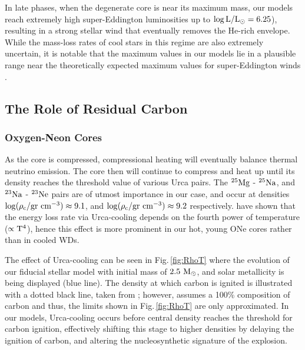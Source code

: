 \documentclass[../../main/thesis_msc.tex]{subfiles}
\begin{document}
In late phases, when the degenerate core is near its maximum mass, our models reach extremely high super-Eddington luminosities up to $\rm \log{L/L_\odot = 6.25}$), resulting in a strong stellar wind that eventually removes the He-rich envelope. While the mass-loss rates of cool stars in this regime are also extremely uncertain, it is notable that the maximum values in our models lie in a plausible range near the theoretically expected maximum values for super-Eddington winds \citep[][]{Owocki:2004zz,Smith2006}.
        
 



    \subsection{The Role of Residual Carbon} \label{sec:residualCarbon}
    
        \subsubsection{Oxygen-Neon Cores}
        
        As the core is compressed, compressional heating will eventually balance thermal neutrino emission. The core then will continue to compress and heat up until its density reaches the threshold value of various Urca pairs. The $\rm ^{25}Mg$ - $\rm ^{25}Na$, and $\rm ^{23}Na$ - $\rm ^{23}Ne$ pairs are of utmost importance in our case, and occur at densities $\rm \log(\rho_c / \rm gr \ cm^{-3}) \approx 9.1$, and $\rm \log(\rho_c / \rm gr \ cm^{-3}) \approx 9.2$ respectively. \cite{Tsuruta1970} have shown that the energy loss rate via Urca-cooling depends on the fourth power of temperature ($\rm \propto T^4$), hence this effect is more prominent in our hot, young ONe cores rather than in cooled WDs.
        
        The effect of Urca-cooling can be seen in Fig.\,\ref{fig:RhoT} where the evolution of our fiducial stellar model with initial mass of $2.5 \rm \  M_{\odot}$, and solar metallicity is being displayed (blue line). The density at which carbon is ignited is illustrated with a dotted black line, taken from \mesa; however, \mesa assumes a 100\% composition of carbon and thus, the limits shown in Fig.\,\ref{fig:RhoT} are only approximated. In our models, Urca-cooling occurs before central density reaches the threshold for carbon ignition, effectively shifting this stage to higher densities by delaying the ignition of carbon, and altering the nucleosynthetic signature of the explosion. 
        
\end{document}
